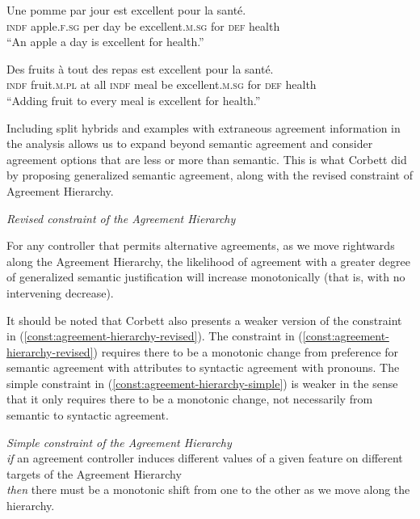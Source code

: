 \begin{exe}
  \ex\label{ex:french-extraneous}
  \begin{xlist}
    \ex\label{ex:french-extraneous-apple}
    \gll Une pomme par jour est excellent pour la santé.\\
    \textsc{indf} apple\textsc{.f.sg} per day be excellent\textsc{.m.sg} for \textsc{def} health\\
    \glt ``An apple a day is excellent for health.''

    \ex\label{ex:french-extraneous-fruits}
    \gll Des fruits à tout des repas est excellent pour la santé.\\
    \textsc{indf} fruit\textsc{.m.pl} at all \textsc{indf} meal be excellent\textsc{.m.sg} for \textsc{def} health\\
    \glt ``Adding fruit to every meal is excellent for health.''
  \end{xlist}
\end{exe}

Including split hybrids and examples with extraneous agreement information in the analysis allows us to expand beyond semantic agreement and consider agreement options that are less or more than semantic. This is what Corbett did by proposing generalized semantic agreement, along with the revised constraint of Agreement Hierarchy.

\begin{exe}
  \ex\label{const:agreement-hierarchy-revised}
  \textit{Revised constraint of the Agreement Hierarchy}
  
  For any controller that permits alternative agreements, as we move rightwards along the Agreement Hierarchy, the likelihood of agreement with a greater degree of generalized semantic justification will increase monotonically (that is, with no intervening decrease).
\end{exe}

It should be noted that Corbett also presents a weaker version of the constraint in (\ref{const:agreement-hierarchy-revised}). The constraint in (\ref{const:agreement-hierarchy-revised}) requires there to be a monotonic change from preference for semantic agreement with attributes to syntactic agreement with pronouns. The simple constraint in (\ref{const:agreement-hierarchy-simple}) is weaker in the sense that it only requires there to be a monotonic change, not necessarily from semantic to syntactic agreement.

\begin{exe}
  \ex\label{const:agreement-hierarchy-simple}
  \textit{Simple constraint of the Agreement Hierarchy}\\
  \textsl{if} an agreement controller induces different values of a given feature on different targets of the Agreement Hierarchy\\
  \textsl{then} there must be a monotonic shift from one to the other as we move along the hierarchy.
\end{exe}

